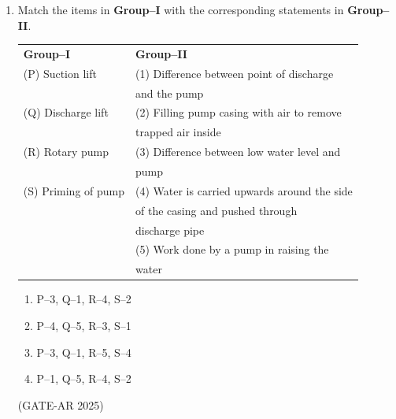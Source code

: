 \documentclass[a4paper,10pt]{article}
\begin{document}
\begin{enumerate}
\item Match the items in \textbf{Group–I} with the corresponding statements in \textbf{Group–II}. \\
\begin{tabular}{ l l }
\textbf{Group–I} & \textbf{Group–II} \\
(P) Suction lift & (1) Difference between point of discharge \\
& and the pump \\
(Q) Discharge lift & (2) Filling pump casing with air to remove \\
& trapped air inside \\
(R) Rotary pump & (3) Difference between low water level and \\
& pump \\
(S) Priming of pump & (4) Water is carried upwards around the side \\
& of the casing and pushed through \\
& discharge pipe \\
& (5) Work done by a pump in raising the \\
& water \\
\end{tabular}
\begin{multicols}{2}
\begin{enumerate}
    \item P–3, Q–1, R–4, S–2
    \item P–4, Q–5, R–3, S–1
    \item P–3, Q–1, R–5, S–4
    \item P–1, Q–5, R–4, S–2
\end{enumerate}
\end{multicols}
\hfill (GATE-AR 2025)


\end{enumerate}
\end{document}
